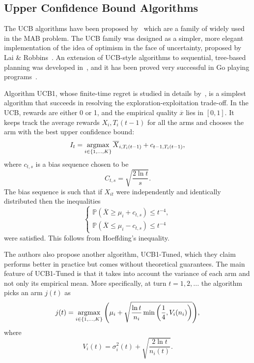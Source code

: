 \subsection*{Upper Confidence Bound Algorithms}
The UCB algorithms have been proposed by~\citep{Auer2002, Auer2002ucb} which are a family of widely used in the MAB problem.  The UCB family was designed as a simpler, more elegant implementation of the idea of optimism in the face of uncertainty, proposed by Lai \& Robbins~\citep{lai1985asymptotically}. An extension of UCB-style algorithms to sequential, tree-based planning was developed in~\citep{Kocsis2006}, and it has been proved very successful in Go playing programs~\citep{Kocsis2006, Gelly2007, Gelly2008}.  

Algorithm UCB1, whose finite-time regret is studied in details by~\citep{Auer2002}, is a simplest algorithm that succeeds in resolving the exploration-exploitation trade-off. In the UCB, rewards are either 0 or 1, and the empirical quality $\overline{x}$ lies in $[0,1]$. It keeps track the average rewards $X_i, T_i(t - 1)$ for all the arms and chooses the arm with the best upper confidence bound:
\begin{equation}
	I_t = \argmax_{i\in \{1,...,K\}}{\overline{X}_{i,T_i(t-1)}+c_{t-1,T_i(t-1)}},
\end{equation}
where $c_{t,s}$ is a bias sequence chosen to be
\begin{equation}
	C_{t,s}=\sqrt{\frac{2\ln t}{s}}.
\end{equation}
The bias sequence is such that if $X_{it}$ were independently and identically distributed then the inequalities
\begin{equation}
\left\{\begin{matrix}
    \mathbb{P}(\overline{X}\geq \mu_i+c_{t,s})\leq t^{-4},\\ 
    \mathbb{P}(\overline{X}\leq \mu_i-c_{t,s})\leq t^{-4}
\end{matrix}\right.\text{}
\end{equation}
were satisfied. This follows from Hoeffding's inequality.

The authors also propose another algorithm, UCB1-Tuned, which they claim performs better in practice but comes without theoretical guarantees. The main feature of UCB1-Tuned is that it takes into account the variance of each arm and not only its empirical mean. More specifically, at turn $t = 1, 2,...$ the algorithm picks an arm $j(t)$ as 
\begin{equation}
   j(t) = \argmax_{i\in \{1,...,K\}}{\left(\mu_i + \sqrt{ \frac{\ln t}{n_i}\min{\left(\frac{1}{4}, V_i(n_i)\right)}  } \right)},
\end{equation}
where
\begin{equation}
   V_i(t) = \sigma_i^2(t) + \sqrt{\frac{2\ln t}{n_i(t)}}.
\end{equation}

